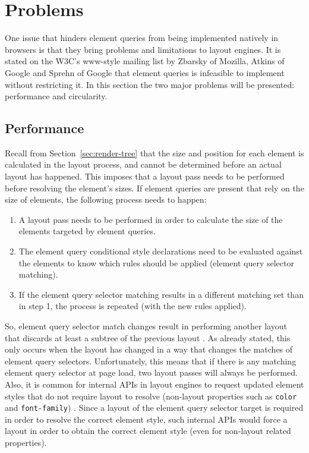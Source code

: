\documentclass[a4paper,11pt]{kth-mag}
\newcommand{\code}[1]{\texttt{#1}}
\begin{document}
    \section{Problems}\label{sec:eq-problems}
      One issue that hinders element queries from being implemented natively in browsers is that they bring problems and limitations to layout engines.
      It is stated on the W3C's www-style mailing list \cite{w3c_eq_mail} by Zbarsky of Mozilla, Atkins of Google and Sprehn of Google that element queries is infeasible to implement without restricting it.
      In this section the two major problems will be presented: performance and circularity.

      \subsection{Performance}
        Recall from Section~\ref{sec:render-tree} that the size and position for each \gls{element} is calculated in the layout process, and cannot be determined before an actual layout has happened.
        This imposes that a layout pass needs to be performed before resolving the \gls{element}'s sizes.
        If element queries are present that rely on the size of \glspl{element}, the following process needs to happen:
        \begin{enumerate}
          \item A layout pass needs to be performed in order to calculate the size of the \glspl{element} targeted by element queries.
          \item The element query conditional style declarations need to be evaluated against the \glspl{element} to know which rules should be applied (element query selector matching).
          \item If the element query selector matching results in a different matching set than in step 1, the process is repeated (with the new rules applied).
        \end{enumerate}
        So, element query selector match changes result in performing another layout that discards at least a subtree of the previous layout \cite{w3c_eq_mail}.
        As already stated, this only occurs when the layout has changed in a way that changes the matches of element query selectors.
        Unfortunately, this means that if there is any matching element query selector at page load, two layout passes will always be performed.
        Also, it is common for internal \glspl{API} in \glspl{layout engine} to request updated \gls{element} styles that do not require layout to resolve (non-layout properties such as \code{color} and \code{font-family}) \cite{w3c_eq_mail}.
        Since a layout of the element query selector target is required in order to resolve the correct \gls{element} style, such internal \glspl{API} would force a layout in order to obtain the correct \gls{element} style (even for non-layout related properties).
\end{document}
